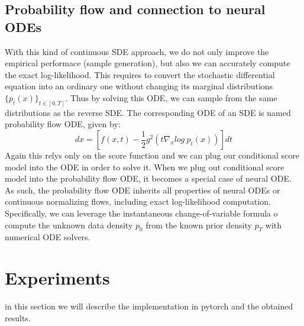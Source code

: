 \documentclass{article}
\begin{document}
	 \subsection{Probability flow and connection to neural ODEs}
	 With this kind of continuous SDE approach, we do not only improve the empirical performace (sample generation), but also we can accurately compute the exact log-likelihood. This requires to convert the stochastic differential equation into an ordinary one without changing its marginal distributions $\{p_{t}(x)\}_{t \in [0,T]}$. Thus by solving this ODE, we can sample from the same distributions as the reverse SDE. The corresponding ODE of an SDE is named probability flow ODE, given by:
	 \begin{equation}
	 dx=[f(x,t) - \frac{1}{2} g^2(t \nabla_{x}log\ p_{t}(x))]dt
	 \end{equation}
Again this relys only on the score function and we can plug our conditional score model into the ODE in order to solve it. When we plug out conditional score model into the probability flow ODE, it becomes a special case of neural ODE. As such, the probability flow ODE inherits all properties of neural ODEs or continuous normalizing flows, including exact log-likelihood computation. Specifically, we can leverage the instantaneous change-of-variable formula o compute the unknown data density $p_{0}$ from the known prior density $p_{T}$ with numerical ODE solvers.
	\newpage
\section{Experiments}
in this section we will describe the implementation in pytorch and the obtained results.
\end{document}

